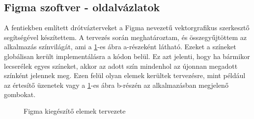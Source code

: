 \subsection{Figma szoftver - oldalvázlatok}
A fentiekben említett drótvázterveket a Figma nevezetű vektorgrafikus szerkesztő segítségével készítettem. A tervezés során meghatároztam, és összegyűjtöttem az alkalmazás színvilágát, ami a \ref{fig.picture-10}-es ábra a-részeként látható. Ezeket a színeket globálisan került implementálásra a kódon belül. Ez azt jelenti, hogy ha bármikor lecserélek egyes színeket, akkor az adott szín mindenhol az újonnan megadott színként jelennek meg. Ezen felül olyan elemek kerültek tervezésre, mint például az értesítő üzenetek vagy a \ref{fig.picture-10}-es ábra b-részén az alkalmazásban megjelenő gombokat.
\begin{figure}[H]
	\centering
	\hspace{5pt}
	\caption{Figma kiegészítő elemek tervezete}
	\label{fig.picture-10}
\end{figure}

